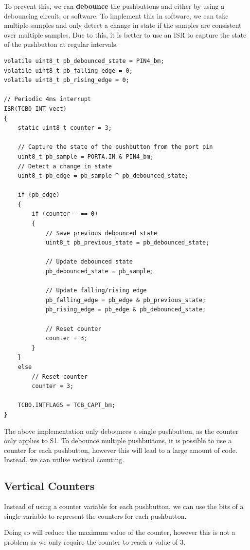 \documentclass{report}
\begin{document}
To prevent this, we can \textbf{debounce} the pushbuttons and either by using a debouncing circuit, or software.
To implement this in software, we can take multiple samples and only detect a change in state if the samples are consistent
over multiple samples. Due to this, it is better to use an ISR to capture the state of the pushbutton at regular intervals.
\begin{verbatim}
volatile uint8_t pb_debounced_state = PIN4_bm;
volatile uint8_t pb_falling_edge = 0;
volatile uint8_t pb_rising_edge = 0;

// Periodic 4ms interrupt
ISR(TCB0_INT_vect)
{
    static uint8_t counter = 3;

    // Capture the state of the pushbutton from the port pin
    uint8_t pb_sample = PORTA.IN & PIN4_bm;
    // Detect a change in state
    uint8_t pb_edge = pb_sample ^ pb_debounced_state;

    if (pb_edge)
    {
        if (counter-- == 0)
        {
            // Save previous debounced state
            uint8_t pb_previous_state = pb_debounced_state;

            // Update debounced state
            pb_debounced_state = pb_sample;

            // Update falling/rising edge
            pb_falling_edge = pb_edge & pb_previous_state;
            pb_rising_edge = pb_edge & pb_debounced_state;

            // Reset counter
            counter = 3;
        }
    }
    else
        // Reset counter
        counter = 3;

    TCB0.INTFLAGS = TCB_CAPT_bm;
}
\end{verbatim}
The above implementation only debounces a single pushbutton, as the counter
only applies to S1. To debounce multiple pushbuttons, it is possible to
use a counter for each pushbutton, however this will lead to a large
amount of code. Instead, we can utilise vertical counting.
\subsection{Vertical Counters}
Instead of using a counter variable for each pushbutton, we can use the
bits of a single variable to represent the counters for each pushbutton.

Doing so will reduce the maximum value of the counter, however this is
not a problem as we only require the counter to reach a value of 3.
\end{document}
